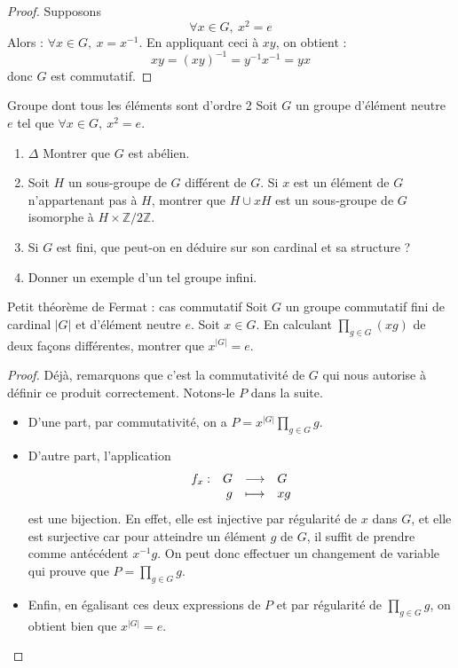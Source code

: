 \documentclass[french,a4paper]{article}
\newcommand{\Z}{\mathbb{Z}}
\newcommand{\inv}{^{-1}}
\theoremstyle{plain}
\theoremstyle{definition}
\theoremstyle{remark}
\begin{document}
\begin{proof}
	Supposons $$\forall x\in G,\ x^2=e$$ Alors : $\forall x\in G,\ x=x\inv$. En appliquant ceci à $xy$, on obtient : $$xy=(xy)\inv=y\inv x\inv=yx$$ donc $G$ est commutatif.
\end{proof}

\begin{ex}[Moulin.AG.19]{Groupe dont tous les éléments sont d'ordre 2}
	Soit $G$ un groupe d'élément neutre $e$ tel que $\forall x\in G,\ x^2=e$.
	\begin{enumerate}
		\item $\Delta$ Montrer que $G$ est abélien.
		\item Soit $H$ un sous-groupe de $G$ différent de $G$. Si $x$ est un élément de $G$ n'appartenant pas à $H$, montrer que $H\cup xH$ est un sous-groupe de $G$ isomorphe à $H\times \Z/2\Z$.
		\item Si $G$ est fini, que peut-on en déduire sur son cardinal et sa structure ?
		\item Donner un exemple d'un tel groupe infini.
	\end{enumerate}
\end{ex}

\begin{ex}[Morlot]{Petit théorème de Fermat : cas commutatif}
	Soit $G$ un groupe commutatif fini de cardinal $|G|$ et d'élément neutre $e$. Soit $x\in G$. En calculant $\displaystyle \prod_{g \in G}(xg)$ de deux façons différentes, montrer que $x^{|G|}=e$.
\end{ex}

\begin{proof}
	Déjà, remarquons que c'est la commutativité de $G$ qui nous autorise à définir ce produit correctement. Notons-le $P$ dans la suite. 
	\begin{itemize}
		\item D'une part, par commutativité, on a $P=x^{|G|}\displaystyle \prod_{g \in G}g$.
		\item D'autre part, l'application 
		$$\begin{array}[t]{lrcl} 
			f_x : & G & \longrightarrow& G \\
			& g & \longmapsto &xg
		\end{array}$$ 
		est une bijection. En effet, elle est injective par régularité de $x$ dans $G$, et elle est surjective car pour atteindre un élément $g$ de $G$, il suffit de prendre comme antécédent $x\inv g$. On peut donc effectuer un changement de variable qui prouve que $P=\displaystyle \prod_{g \in G}g$.
		\item Enfin, en égalisant ces deux expressions de $P$ et par régularité de $\displaystyle \prod_{g \in G}g$, on obtient bien que $x^{|G|}=e$.
	\end{itemize}
\end{proof}
\end{document}
